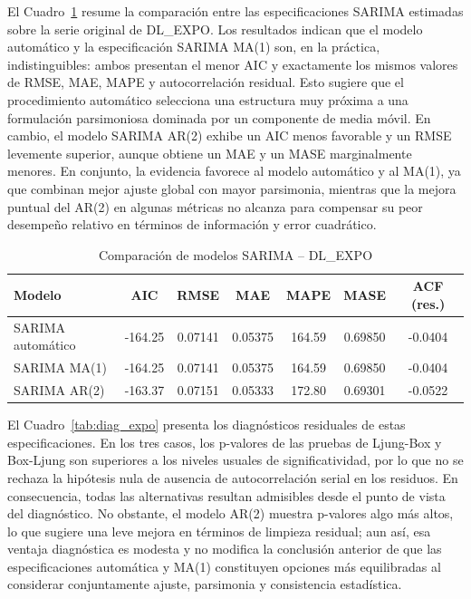 \documentclass[11pt]{article}
\begin{document}
El Cuadro~\ref{tab:sarima_expo} resume la comparación entre las especificaciones SARIMA estimadas sobre la serie original de DL\_EXPO. Los resultados indican que el modelo automático y la especificación SARIMA MA(1) son, en la práctica, indistinguibles: ambos presentan el menor AIC y exactamente los mismos valores de RMSE, MAE, MAPE y autocorrelación residual. Esto sugiere que el procedimiento automático selecciona una estructura muy próxima a una formulación parsimoniosa dominada por un componente de media móvil. En cambio, el modelo SARIMA AR(2) exhibe un AIC menos favorable y un RMSE levemente superior, aunque obtiene un MAE y un MASE marginalmente menores. En conjunto, la evidencia favorece al modelo automático y al MA(1), ya que combinan mejor ajuste global con mayor parsimonia, mientras que la mejora puntual del AR(2) en algunas métricas no alcanza para compensar su peor desempeño relativo en términos de información y error cuadrático.

\begin{table}[H]
\centering
\caption{Comparación de modelos SARIMA – DL\_EXPO}
\label{tab:sarima_expo}
\begin{tabular}{lcccccc}
\hline
Modelo & AIC & RMSE & MAE & MAPE & MASE & ACF (res.) \\
\hline
SARIMA automático & -164.25 & 0.07141 & 0.05375 & 164.59 & 0.69850 & -0.0404 \\
SARIMA MA(1)      & -164.25 & 0.07141 & 0.05375 & 164.59 & 0.69850 & -0.0404 \\
SARIMA AR(2)      & -163.37 & 0.07151 & 0.05333 & 172.80 & 0.69301 & -0.0522 \\
\hline
\end{tabular}
\end{table}

El Cuadro~\ref{tab:diag_expo} presenta los diagnósticos residuales de estas especificaciones. En los tres casos, los p-valores de las pruebas de Ljung-Box y Box-Ljung son superiores a los niveles usuales de significatividad, por lo que no se rechaza la hipótesis nula de ausencia de autocorrelación serial en los residuos. En consecuencia, todas las alternativas resultan admisibles desde el punto de vista del diagnóstico. No obstante, el modelo AR(2) muestra p-valores algo más altos, lo que sugiere una leve mejora en términos de limpieza residual; aun así, esa ventaja diagnóstica es modesta y no modifica la conclusión anterior de que las especificaciones automática y MA(1) constituyen opciones más equilibradas al considerar conjuntamente ajuste, parsimonia y consistencia estadística.
\end{document}

